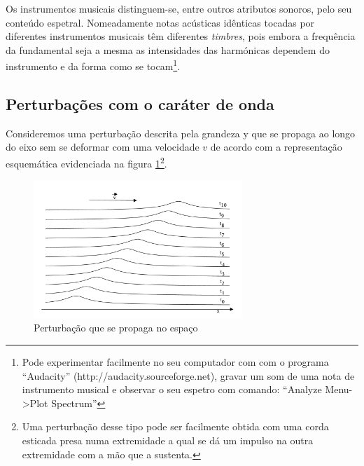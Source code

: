 \documentclass[a4paper,12pt]{article}      %
\begin{document}

Os instrumentos musicais distinguem-se, entre outros atributos sonoros, pelo seu conteúdo espetral.
Nomeadamente notas acústicas idênticas tocadas por diferentes instrumentos musicais têm diferentes \emph{timbres}, pois embora a frequência da fundamental seja a mesma as intensidades das harmónicas dependem do instrumento e da forma como se tocam\footnote{Pode experimentar facilmente no seu computador com  com o programa “Audacity” (http://audacity.sourceforge.net), gravar um som de uma nota de instrumento musical e observar o seu espetro com comando: “Analyze Menu->Plot Spectrum”}.


\subsection{\sf Perturbações com o caráter de onda}

Consideremos uma perturbação descrita pela grandeza y que se propaga ao longo do eixo sem se deformar com uma velocidade $v$ de acordo com a representação esquemática evidenciada na figura \ref{fig:Propag_onda}\footnote{Uma perturbação desse tipo pode ser facilmente obtida com uma corda esticada presa numa extremidade a qual se dá um impulso na outra extremidade com a mão que a sustenta.}.

\begin{figure}
	[tbp]  \centering 
	\includegraphics[width=0.7\textwidth]{Propag_onda} \caption{Perturbação que se propaga no espaço\label{fig:Propag_onda}} 
\end{figure}
\end{document}

